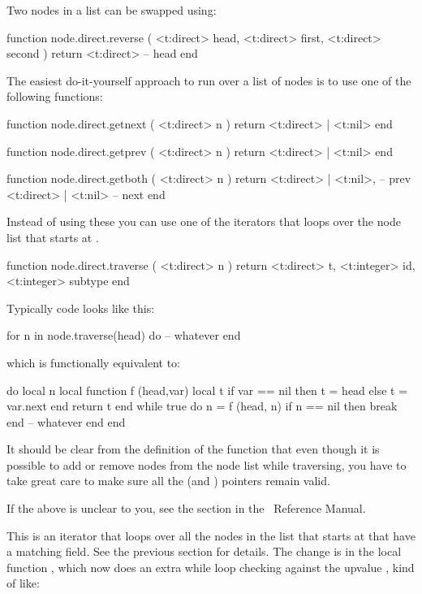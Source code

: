 Two nodes in a list can be swapped using:

\starttyping[option=LUA]
function node.direct.reverse (
    <t:direct> head,
    <t:direct> first,
    <t:direct> second
)
    return <t:direct> -- head
end
\stoptyping



\stopsubsection

\startsubsection[title={Traversing}]

The easiest do-it-yourself approach to run over a list of nodes is to use one of
the following functions:

\starttyping[option=LUA]
function node.direct.getnext ( <t:direct> n )
    return <t:direct> | <t:nil>
end

function node.direct.getprev ( <t:direct> n )
    return <t:direct> | <t:nil>
end

function node.direct.getboth ( <t:direct> n )
    return
        <t:direct> | <t:nil>, -- prev
        <t:direct> | <t:nil>  -- next
end
\stoptyping

Instead of using these you can use one of the iterators that loops over the node
list that starts at .

\starttyping[option=LUA]
function node.direct.traverse ( <t:direct> n )
    return
        <t:direct>  t,
        <t:integer> id,
        <t:integer> subtype
end
\stoptyping

Typically code looks like this:

\starttyping[option=LUA]
for n in node.traverse(head) do
    -- whatever
end
\stoptyping

which is functionally equivalent to:

\starttyping[option=LUA]
do
    local n
    local function f (head,var)
        local t
        if var == nil then
            t = head
        else
            t = var.next
        end
        return t
    end
    while true do
        n = f (head, n)
        if n == nil then
            break
        end
        -- whatever
    end
end
\stoptyping

It should be clear from the definition of the function  that even though
it is possible to add or remove nodes from the node list while traversing, you
have to take great care to make sure all the  (and )
pointers remain valid.

If the above is unclear to you, see the section  in the
\LUA\ Reference Manual.

This is an iterator that loops over all the nodes in the list that starts at
 that have a matching  field. See the previous section for
details. The change is in the local function , which now does an extra
while loop checking against the upvalue , kind of like:

